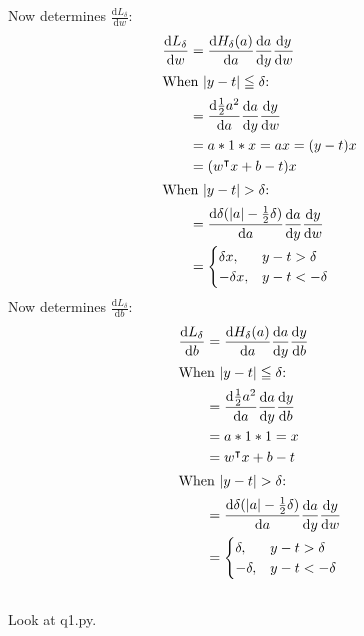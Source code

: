 \documentclass{article}
\begin{document}
\subsection{}
Now determines $\frac{\mathrm{d} L_\delta}{\mathrm{d} w}$:
\begin{align*}
    \frac{\mathrm{d} L_\delta}{\mathrm{d} w}&=  \frac{\mathrm{d} H_\delta (a)}{\mathrm{d} a} \frac{\mathrm{d} a}{\mathrm{d} y}\frac{\mathrm{d} y}{\mathrm{d} w}\\
\intertext{When $|y-t| \leqq \delta$:}
    &= \frac{\mathrm{d} \frac{1}{2}a^2 }{\mathrm{d} a} \frac{\mathrm{d} a}{\mathrm{d} y} \frac{\mathrm{d} y}{\mathrm{d} w}\\
    &= a * 1 * x = ax = (y-t)x\\
    &= (w^\intercal x+b-t)x\\
\intertext{When $|y-t| > \delta$:}
    &= \frac{\mathrm{d} \delta(|a|-\frac{1}{2}\delta)}{\mathrm{d} a} \frac{\mathrm{d} a}{\mathrm{d} y} \frac{\mathrm{d} y}{\mathrm{d} w}\\
    &=
    \begin{cases}
    \delta x, &y-t>\delta\\
    -\delta x, &y-t<-\delta\\
    \end{cases}
\end{align*}
Now determines $\frac{\mathrm{d} L_\delta}{\mathrm{d} b}$:
\begin{align*}
    \frac{\mathrm{d} L_\delta}{\mathrm{d} b}&=  \frac{\mathrm{d} H_\delta (a)}{\mathrm{d} a} \frac{\mathrm{d} a}{\mathrm{d} y}\frac{\mathrm{d} y}{\mathrm{d} b}\\
\intertext{When $|y-t| \leqq \delta$:}
    &= \frac{\mathrm{d} \frac{1}{2}a^2 }{\mathrm{d} a} \frac{\mathrm{d} a}{\mathrm{d} y} \frac{\mathrm{d} y}{\mathrm{d} b}\\
    &= a * 1 * 1 = x\\
    &= w^\intercal x+b-t\\
\intertext{When $|y-t| > \delta$:}
    &= \frac{\mathrm{d} \delta(|a|-\frac{1}{2}\delta)}{\mathrm{d} a} \frac{\mathrm{d} a}{\mathrm{d} y} \frac{\mathrm{d} y}{\mathrm{d} w}\\
    &=
    \begin{cases}
    \delta , &y-t>\delta\\
    -\delta , &y-t<-\delta\\
    \end{cases}
\end{align*}
\subsection{}
Look at q1.py.
\end{document}
